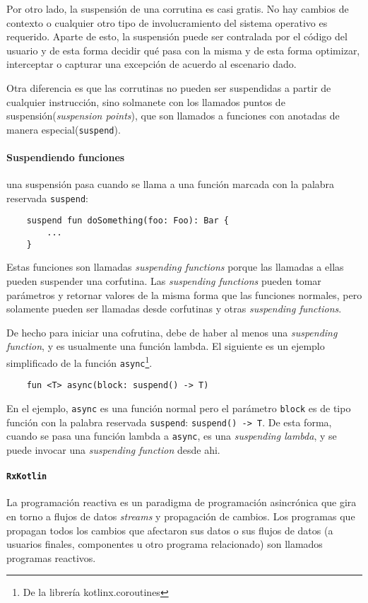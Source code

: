 Por otro lado, la suspensión de una corrutina es casi gratis. No hay cambios de contexto o cualquier otro tipo de involucramiento del sistema operativo es requerido. Aparte de esto, la suspensión puede ser contralada por el código del usuario y de esta forma decidir qué pasa con la misma y de esta forma optimizar, interceptar o capturar una excepción de acuerdo al escenario dado.

Otra diferencia es que las corrutinas no pueden ser suspendidas a partir de cualquier instrucción, sino solmanete con los llamados puntos de suspensión(\emph{suspension points}), que son llamados a funciones con anotadas de manera especial(\texttt{suspend}).

\paragraph{Suspendiendo funciones} una suspensión pasa cuando se llama a una función marcada con la palabra reservada \texttt{suspend}:
\begin{verbatim}
    suspend fun doSomething(foo: Foo): Bar {
        ...
    }
\end{verbatim}
Estas funciones son llamadas \emph{suspending functions} porque las llamadas a ellas pueden suspender una corfutina. Las \emph{suspending functions} pueden tomar parámetros y retornar valores de la misma forma que las funciones normales, pero solamente pueden ser llamadas desde corfutinas y otras \emph{suspending functions}.

De hecho para iniciar una cofrutina, debe de haber al menos una \emph{suspending function}, y es usualmente una función lambda. El siguiente es un ejemplo simplificado de la función \texttt{async}\footnote{De la librería kotlinx.coroutines}.
\begin{verbatim}
    fun <T> async(block: suspend() -> T)
\end{verbatim}
En el ejemplo, \texttt{async} es una función normal pero el parámetro \texttt{block} es de tipo función con la palabra reservada \texttt{suspend}: \texttt{suspend() -> T}. De esta forma, cuando se pasa una función lambda a \texttt{async}, es una \emph{suspending lambda}, y se puede invocar una \emph{suspending function} desde ahi.

\paragraph{\texttt{RxKotlin}\cite{rxkotlin}} La programación reactiva es un paradigma de programación asincrónica que gira en torno a flujos de datos \emph{streams} y propagación de cambios. Los programas que propagan todos los cambios que afectaron sus datos o sus flujos de datos (a usuarios finales, componentes u otro programa relacionado) son llamados programas reactivos.

